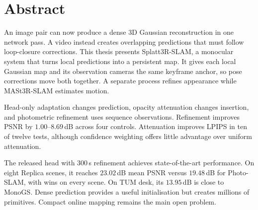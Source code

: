 \chapter*{Abstract}
\begin{singlespace}

An image pair can now produce a dense 3D Gaussian reconstruction in one
network pass. A video instead creates overlapping predictions that must follow
loop-closure corrections. This thesis presents Splatt3R-SLAM, a monocular
system that turns local predictions into a persistent map. It gives each
local Gaussian map and its observation cameras the same keyframe anchor, so
pose corrections move both together. A separate process refines appearance
while MASt3R-SLAM estimates motion.

Head-only adaptation changes prediction, opacity attenuation changes
insertion, and photometric refinement uses sequence observations. Refinement
improves PSNR by $1.00$--$8.69$\,dB across four controls. Attenuation
improves LPIPS in ten of twelve tests, although confidence weighting offers
little advantage over uniform attenuation.

The released head with $300$\,s refinement achieves state-of-the-art
performance. On eight Replica scenes, it reaches $23.02$\,dB mean PSNR versus
$19.48$\,dB for Photo-SLAM, with wins on every scene. On TUM desk, its
$13.95$\,dB is close to MonoGS. Dense prediction provides a useful
initialisation but creates millions of primitives. Compact online mapping
remains the main open problem.
\end{singlespace}
